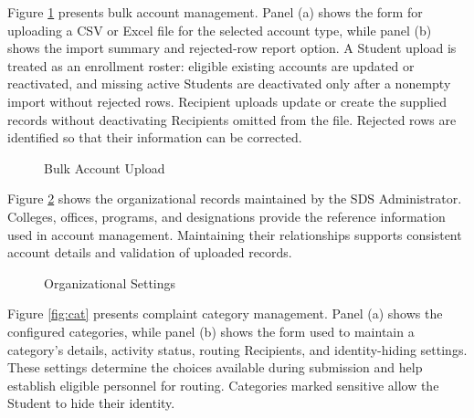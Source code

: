 Figure \ref{fig:upload} presents bulk account management. Panel (a) shows the form for uploading a CSV or Excel file for the selected account type, while panel (b) shows the import summary and rejected-row report option. A Student upload is treated as an enrollment roster: eligible existing accounts are updated or reactivated, and missing active Students are deactivated only after a nonempty import without rejected rows. Recipient uploads update or create the supplied records without deactivating Recipients omitted from the file. Rejected rows are identified so that their information can be corrected.

\renewcommand{\thefigure}{5.35}
\begin{figure}[htbp]
    \centering
    \par{}\par
    \medskip
    \par{}\par
    \caption{Bulk Account Upload}
    \label{fig:upload}
\end{figure}
\FloatBarrier

Figure \ref{fig:org} shows the organizational records maintained by the SDS Administrator. Colleges, offices, programs, and designations provide the reference information used in account management. Maintaining their relationships supports consistent account details and validation of uploaded records.

\renewcommand{\thefigure}{5.36}
\begin{figure}[htbp]
    \centering
    \caption{Organizational Settings}
    \label{fig:org}
\end{figure}
\FloatBarrier

Figure \ref{fig:cat} presents complaint category management. Panel (a) shows the configured categories, while panel (b) shows the form used to maintain a category's details, activity status, routing Recipients, and identity-hiding settings. These settings determine the choices available during submission and help establish eligible personnel for routing. Categories marked sensitive allow the Student to hide their identity.

